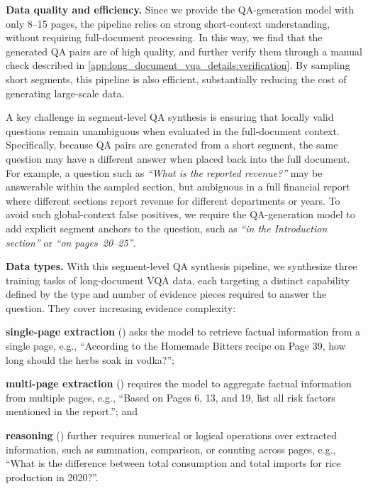 {\noindent\textbf{Data quality and efficiency.}
Since we provide the QA-generation model with only 8--15 pages, the pipeline relies on strong short-context understanding, without requiring full-document processing.
In this way, we find that the generated QA pairs are of high quality, and further verify them through a manual check described in \cref{app:long_document_vqa_details:verification}.
By sampling short segments, this pipeline is also efficient, substantially reducing the cost of generating large-scale data.

A key challenge in segment-level QA synthesis is ensuring that locally valid questions remain unambiguous when evaluated in the full-document context.
Specifically, because QA pairs are generated from a short segment, the same question may have a different answer when placed back into the full document.
For example, a question such as \textit{``What is the reported revenue?''} may be answerable within the sampled section, but ambiguous in a full financial report where different sections report revenue for different departments or years.
To avoid such global-context false positives, we require the QA-generation model to add explicit segment anchors to the question, such as \textit{``in the Introduction section''} or \textit{``on pages~20--25''}.

\noindent\textbf{Data types.}
With this segment-level QA synthesis pipeline, we synthesize three training tasks of long-document VQA data, each targeting a distinct capability defined by the type and number of evidence pieces required to answer the question.
They cover increasing evidence complexity:
\begin{inparaenum}[(i)]
\item \textbf{single-page extraction} (\extractsingle) asks the model to retrieve factual information from a single page, e.g., ``According to the Homemade Bitters recipe on Page 39, how long should the herbs soak in vodka?'';
\item \textbf{multi-page extraction} (\extractmulti) requires the model to aggregate factual information from multiple pages, e.g., ``Based on Pages 6, 13, and 19, list all risk factors mentioned in the report.''; and
\item \textbf{reasoning} (\reasoningtask) further requires numerical or logical operations over extracted information, such as summation, comparison, or counting across pages, e.g., ``What is the difference between total consumption and total imports for rice production in 2020?''.
\end{inparaenum}

}
